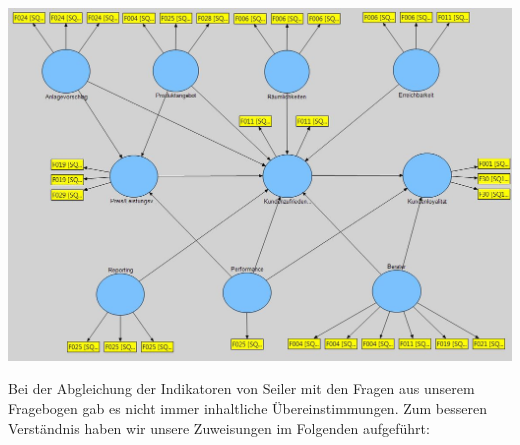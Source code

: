 \documentclass{article}\usepackage[]{graphicx}\usepackage[]{color}
\begin{document}
\hspace*{-4.8cm}\includegraphics[scale = 0.882]{figure/zweitesmodell}


Bei der Abgleichung der Indikatoren von Seiler mit den Fragen aus unserem Fragebogen gab es nicht immer inhaltliche Übereinstimmungen. Zum besseren Verständnis haben wir unsere Zuweisungen im Folgenden aufgeführt:
\end{document}
